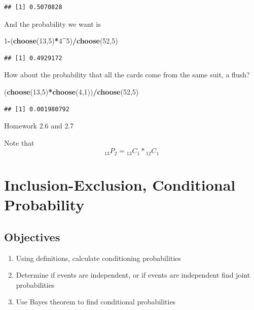 \documentclass[]{book}
\newenvironment{Shaded}{\begin{snugshade}}{\end{snugshade}}
\newcommand{\KeywordTok}[1]{\textcolor[rgb]{0.13,0.29,0.53}{\textbf{#1}}}
\newcommand{\DecValTok}[1]{\textcolor[rgb]{0.00,0.00,0.81}{#1}}
\newcommand{\OperatorTok}[1]{\textcolor[rgb]{0.81,0.36,0.00}{\textbf{#1}}}
\newcommand{\NormalTok}[1]{#1}
\providecommand{\tightlist}{%
  \setlength{\itemsep}{0pt}\setlength{\parskip}{0pt}}
\theoremstyle{definition}
\theoremstyle{definition}
\theoremstyle{definition}
\theoremstyle{remark}
\begin{document}
\begin{verbatim}
## [1] 0.5070828
\end{verbatim}

And the probability we want is

\begin{Shaded}
\begin{Highlighting}[]
\DecValTok{1}\OperatorTok{-}\NormalTok{(}\KeywordTok{choose}\NormalTok{(}\DecValTok{13}\NormalTok{,}\DecValTok{5}\NormalTok{)}\OperatorTok{*}\DecValTok{4}\OperatorTok{^}\DecValTok{5}\NormalTok{)}\OperatorTok{/}\KeywordTok{choose}\NormalTok{(}\DecValTok{52}\NormalTok{,}\DecValTok{5}\NormalTok{)}
\end{Highlighting}
\end{Shaded}

\begin{verbatim}
## [1] 0.4929172
\end{verbatim}

How about the probability that all the cards come from the same suit, a
flush?

\begin{Shaded}
\begin{Highlighting}[]
\NormalTok{(}\KeywordTok{choose}\NormalTok{(}\DecValTok{13}\NormalTok{,}\DecValTok{5}\NormalTok{)}\OperatorTok{*}\KeywordTok{choose}\NormalTok{(}\DecValTok{4}\NormalTok{,}\DecValTok{1}\NormalTok{))}\OperatorTok{/}\KeywordTok{choose}\NormalTok{(}\DecValTok{52}\NormalTok{,}\DecValTok{5}\NormalTok{)}
\end{Highlighting}
\end{Shaded}

\begin{verbatim}
## [1] 0.001980792
\end{verbatim}

Homework 2.6 and 2.7

Note that \[{_{13}P_{2}}= {_{13}C_{1}} * {_{12}C_{1}}\]

\hypertarget{L6}{\section{Inclusion-Exclusion, Conditional
Probability}\label{L6}}

\subsection{Objectives}\label{objectives-5}

\begin{enumerate}
\def\labelenumi{\arabic{enumi}.}
\tightlist
\item
  Using definitions, calculate conditioning probabilities\\
\item
  Determine if events are independent, or if events are independent find
  joint probabilities\\
\item
  Use Bayes theorem to find conditional probabilities
\end{enumerate}
\end{document}
